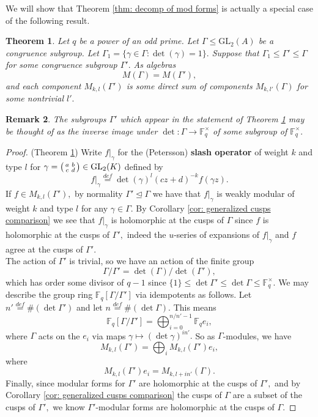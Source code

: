 \documentclass[11pt]{amsart}
\newtheorem{theorem}{Theorem}[section]
\newtheorem{remark}[theorem]{Remark}
\theoremstyle{definition}
\newenvironment{psmallmatrix}
{\left(\begin{smallmatrix}}
	{\end{smallmatrix}\right)}
\numberwithin{equation}{section}
\newcommand{\GL}{\mathrm{GL}} 	%
\newcommand{\bbF}{\mathbb{F}}		%
\begin{document}
We will show that Theorem \ref{thm: decomp of mod forms} is actually a special case of the following result.
\begin{theorem}
	\label{thm: generalized decomp}
	Let $q$ be a power of an odd prime. Let $\Gamma\leq \GL_2(A)$ be a congruence subgroup. Let $\Gamma_1=\{\gamma\in \Gamma: \det(\gamma)=1\}.$ Suppose that $\Gamma_1\leq \Gamma'\leq \Gamma$ for some congruence subgroup $\Gamma'.$ As algebras
	\[M(\Gamma)=M(\Gamma'),\] and each component $M_{k,l}(\Gamma')$ is some direct sum of components $M_{k,l'}(\Gamma)$ for some nontrivial $l'.$
\end{theorem}
\begin{remark}
	The subgroups $\Gamma'$ which appear in the statement of Theorem \ref{thm: generalized decomp} may be thought of as the inverse image under $\det:\Gamma\to \bbF_q^{\times}$ of some subgroup of $\bbF_q^{\times}.$
\end{remark}
\begin{proof}(Theorem \ref{thm: generalized decomp})
	Write $f|_{\gamma}$ for the (Petersson) \textbf{slash operator} of weight $k$ and type $l$ for $\displaystyle{\gamma=\begin{psmallmatrix}a&b\\c&d\end{psmallmatrix}\in \GL_2(K)}$ defined by \[f|_{\gamma}\overset{def}{=}\det(\gamma)^l(cz+d)^{-k}f(\gamma z).\] If $f\in M_{k,l}(\Gamma'),$ by normality $\Gamma'\unlhd \Gamma$ we have that $f|_{\gamma}$ is weakly modular of weight $k$ and type $l$ for any $\gamma\in \Gamma.$ By Corollary \ref{cor: generalized cusps comparison} we see that $f|_{\gamma}$ is holomorphic at the cusps of $\Gamma$ since $f$ is holomorphic at the cusps of $\Gamma',$ indeed the $u$-series of expansions of $f|_{\gamma}$ and $f$ agree at the cusps of $\Gamma'.$\\
	
	The action of $\Gamma'$ is trivial, so we have an action of the finite group \[\Gamma/\Gamma'=\det(\Gamma)/\det(\Gamma'),\] which has order some divisor of $q-1$ since $\{1\}\leq \det\Gamma'\leq \det\Gamma\leq \bbF_q^{\times}.$ We may describe the group ring $\bbF_q[\Gamma/\Gamma']$ via idempotents as follows. Let $n'\overset{def}{=}\#(\det\Gamma')$ and let $n\overset{def}{=}\#(\det\Gamma).$ This means 
	\[\bbF_q[\Gamma/\Gamma']=\bigoplus_{i=0}^{n/n'-1}\bbF_qe_i,\]
	where $\Gamma$ acts on the $e_i$ via maps $\gamma\mapsto (\det\gamma)^{in'}.$ So as $\Gamma$-modules, we have \[M_{k,l}(\Gamma')=\bigoplus_i M_{k,l}(\Gamma')e_i,\] where \[M_{k,l}(\Gamma')e_i=M_{k,l+in'}(\Gamma).\] Finally, since modular forms for $\Gamma'$ are holomorphic at the cusps of $\Gamma',$ and by Corollary \ref{cor: generalized cusps comparison} the cusps of $\Gamma$ are a subset of the cusps of $\Gamma',$ we know $\Gamma'$-modular forms are holomorphic at the cusps of $\Gamma.$
\end{proof}
\end{document}
